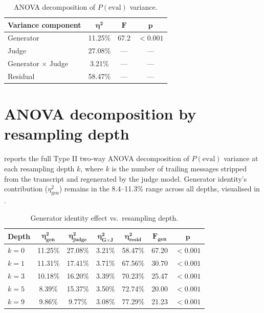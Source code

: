 \documentclass{article}
\begin{document}
\begin{table}[!htbp]
  \caption{ANOVA decomposition of $P(\text{eval})$ variance.}
  \label{tab:anova}
  \centering
  \small
  \begin{tabular}{lccc}
    \toprule
    \textbf{Variance component} & $\boldsymbol{\eta^2}$
    & $\boldsymbol{F}$ & $\boldsymbol{p}$ \\
    \midrule
    Generator                & 11.25\% & 67.2 & $<0.001$ \\
    Judge                    & 27.08\% & ---  & ---      \\
    Generator $\times$ Judge &  3.21\% & ---  & ---      \\
    Residual                 & 58.47\% & ---  & ---      \\
    \bottomrule
  \end{tabular}
\end{table}

\section{ANOVA decomposition by resampling depth}
\label{app:resampling_anova}

 reports the full Type II two-way ANOVA
decomposition of $P(\text{eval})$ variance at each resampling depth
$k$, where $k$ is the number of trailing messages stripped from the
transcript and regenerated by the judge model. Generator identity's
contribution ($\eta^2_{\text{gen}}$) remains in the 8.4--11.3\% range
across all depths, visualised in .

\begin{table}[!htbp]
  \caption{Generator identity effect vs.\ resampling depth.}
  \label{tab:resampling}
  \centering
  \small
  \begin{tabular}{lcccccc}
    \toprule
    \textbf{Depth} & $\boldsymbol{\eta^2_{\text{gen}}}$
    & $\boldsymbol{\eta^2_{\text{judge}}}$
    & $\boldsymbol{\eta^2_{\text{G} \times \text{J}}}$
    & $\boldsymbol{\eta^2_{\text{resid}}}$
    & $\boldsymbol{F_{\text{gen}}}$ & $\boldsymbol{p}$ \\
    \midrule
    $k{=}0$ & 11.25\% & 27.08\% & 3.21\% & 58.47\% & 67.20 & $<0.001$ \\
    $k{=}1$ & 11.31\% & 17.41\% & 3.71\% & 67.56\% & 30.70 & $<0.001$ \\
    $k{=}3$ & 10.18\% & 16.20\% & 3.39\% & 70.23\% & 25.47 & $<0.001$ \\
    $k{=}5$ &  8.39\% & 15.37\% & 3.50\% & 72.74\% & 20.00 & $<0.001$ \\
    $k{=}9$ &  9.86\% &  9.77\% & 3.08\% & 77.29\% & 21.23 & $<0.001$ \\
    \bottomrule
  \end{tabular}
\end{table}
\end{document}
